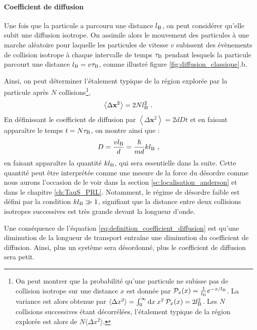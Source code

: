 \paragraph*{Coefficient de diffusion}
Une fois que la particule a parcouru une distance $l_{\mathrm{B}}$, on peut considérer qu'elle subit une diffusion isotrope. On assimile alors le mouvement des particules à une marche aléatoire pour laquelle les particules de vitesse $v$ subissent des évènements de collision isotrope à chaque intervalle de temps $\tau_{\mathrm{B}}$ pendant lesquels la particule parcourt une distance $l_{\mathrm{B}}=v \tau_{\mathrm{B}}$, comme illustré figure \ref{fig:diffusion_classique}.b.

Ainsi, on peut déterminer l'étalement typique de la région explorée par la particule après $N$ collisions\footnote{On peut montrer que la probabilité qu'une particule ne subisse pas de collision isotrope sur une distance $x$ est donnée par $\mathcal{P}_x(x)=\frac{1}{l_{\mathrm{B}}} e^{-x/l_{\mathrm{B}}}$. La variance est alors obtenue par $\langle\Delta x^2 \rangle = \int_0^\infty{\mathop{}\mathopen{}\mathrm{d}x \: x^2 \:  \mathcal{P}_x(x)}=2l_{\mathrm{B}}^2 $. Les $N$ collisions successives étant décorrélées, l'étalement typique de la région explorée est alors de $N \langle\Delta x^2 \rangle$.},
\begin{equation}
\left\langle \Delta \mathbf{x}^2 \right\rangle=2 N l_{\mathrm{B}}^2 \text{ .}
\end{equation}
En définissant le coefficient de diffusion par $ \left\langle \Delta \mathbf{x}^2 \right\rangle = 2 d D t$ et en faisant apparaître le temps $t=N \tau_{\mathrm{B}}$, on montre ainsi que \citep{akkermans2007mesoscopic}:
\begin{equation}
D=\frac{v l_{\mathrm{B}}}{d}=\frac{\hslash}{m d} k l_{\mathrm{B}} \text{ ,}
\label{eq:definition_coefficient_diffusion}
\end{equation}
en faisant apparaître la quantité $k l_{\mathrm{B}}$, qui sera essentielle dans la suite. Cette quantité peut être interprétée comme une mesure de la force du désordre comme nous aurons l'occasion de le voir dans la section \ref{sc:localisation_anderson} et dans le chapitre \ref{ch:TauS_PRL}. Notamment, le régime de désordre faible est défini par la condition $kl_{\mathrm{B}}\gg 1$, signifiant que la distance entre deux collisions isotropes successives est très grande devant la longueur d'onde.

Une conséquence de l'équation \ref{eq:definition_coefficient_diffusion} est qu'une diminution de la longueur de transport entraîne une diminution du coefficient de diffusion. Ainsi, plus un système sera désordonné, plus le coefficient de diffusion sera petit.














